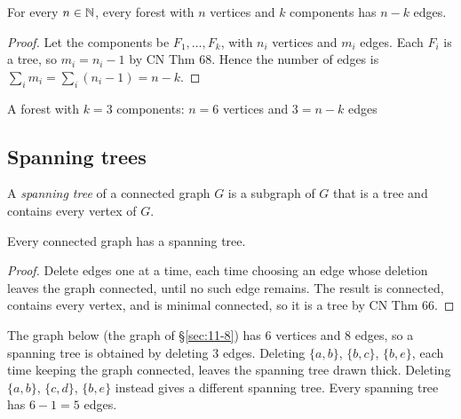 \begin{theorem}[CN Thm 69]
For every $n\in\mathbb{N}$, every forest with $n$ vertices and $k$ components has $n-k$ edges.
\end{theorem}
\begin{proof}
Let the components be $F_1,\dots,F_k$, with $n_i$ vertices and $m_i$ edges. Each $F_i$ is a tree, so $m_i=n_i-1$ by CN Thm 68. Hence the number of edges is $\sum_i m_i = \sum_i (n_i-1) = n-k$.
\end{proof}

\begin{center}
\end{center}
\begin{center}
\small A forest with $k=3$ components: $n=6$ vertices and $3=n-k$ edges
\end{center}

\subsection{Spanning trees}
\label{sec:12-4}

\begin{definition}
A \emph{spanning tree} of a connected graph $G$ is a subgraph of $G$ that is a tree and contains every vertex of $G$.
\end{definition}

\begin{proposition}[Existence]
Every connected graph has a spanning tree.
\end{proposition}
\begin{proof}
Delete edges one at a time, each time choosing an edge whose deletion leaves the graph connected, until no such edge remains. The result is connected, contains every vertex, and is minimal connected, so it is a tree by CN Thm 66.
\end{proof}

\begin{example}
The graph below (the graph of \S\ref{sec:11-8}) has $6$ vertices and $8$ edges, so a spanning tree is obtained by deleting $3$ edges. Deleting $\{a,b\}$, $\{b,c\}$, $\{b,e\}$, each time keeping the graph connected, leaves the spanning tree drawn thick. Deleting $\{a,b\}$, $\{c,d\}$, $\{b,e\}$ instead gives a different spanning tree. Every spanning tree has $6-1=5$ edges.
\end{example}

